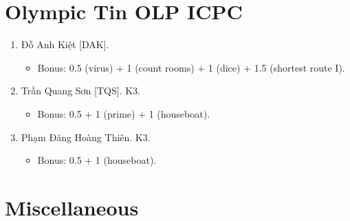 \documentclass{article}
\begin{document}

\section{Olympic Tin OLP ICPC}

\begin{enumerate}
	\item {\sc Đỗ Anh Kiệt [DAK].}
	\begin{itemize}
		\item Bonus: 0.5 (virus) + 1 (count rooms) + 1 (dice) + 1.5 (shortest route I).
	\end{itemize}
	\item {\sc Trần Quang Sơn [TQS].} K3.
	\begin{itemize}
		\item Bonus: 0.5 + 1 (prime) + 1 (houseboat).
	\end{itemize}
	\item {\sc Phạm Đăng Hoàng Thiên.} K3.
		\begin{itemize}
		\item Bonus: 0.5 + 1 (houseboat).
	\end{itemize}
\end{enumerate}


\section{Miscellaneous}


\printbibliography[heading=bibintoc]
	
\end{document}
